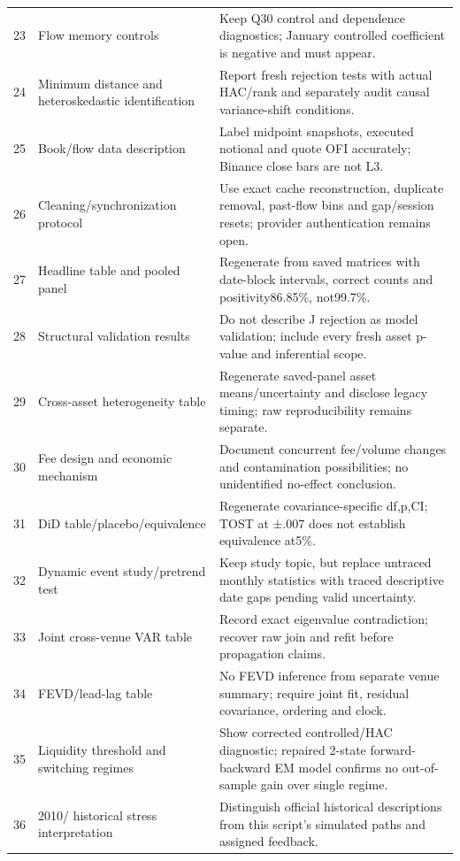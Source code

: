 \begin{longtable}{rp{}p{}}
23 & Flow memory controls & Keep Q30 control and dependence diagnostics; January controlled coefficient is negative and must appear.\\
24 & Minimum distance and heteroskedastic identification & Report fresh rejection tests with actual HAC/rank and separately audit causal variance-shift conditions.\\
25 & Book/\allowbreak flow data description & Label midpoint snapshots, executed notional and quote OFI accurately; Binance close bars are not L3.\\
26 & Cleaning/\allowbreak synchronization protocol & Use exact cache reconstruction, duplicate removal, past-flow bins and gap/session resets; provider authentication remains open.\\
27 & Headline table and pooled panel & Regenerate from saved matrices with date-block intervals, correct counts and positivity86.85\%, not99.7\%.\\
28 & Structural validation results & Do not describe J rejection as model validation; include every fresh asset p-value and inferential scope.\\
29 & Cross-asset heterogeneity table & Regenerate saved-panel asset means/uncertainty and disclose legacy timing; raw reproducibility remains separate.\\
30 & Fee design and economic mechanism & Document concurrent fee/volume changes and contamination possibilities; no unidentified no-effect conclusion.\\
31 & DiD table/\allowbreak placebo/\allowbreak equivalence & Regenerate covariance-specific df,p,CI; TOST at ±.007 does not establish equivalence at5\%.\\
32 & Dynamic event study/\allowbreak pretrend test & Keep study topic, but replace untraced monthly statistics with traced descriptive date gaps pending valid uncertainty.\\
33 & Joint cross-venue VAR table & Record exact eigenvalue contradiction; recover raw join and refit before propagation claims.\\
34 & FEVD/\allowbreak lead-lag table & No FEVD inference from separate venue summary; require joint fit, residual covariance, ordering and clock.\\
35 & Liquidity threshold and switching regimes & Show corrected controlled/HAC diagnostic; repaired 2-state forward-backward EM model confirms no out-of-sample gain over single regime.\\
36 & 2010/\allowbreak 2014 historical stress interpretation & Distinguish official historical descriptions from this script’s simulated paths and assigned feedback.\\

\end{longtable}

